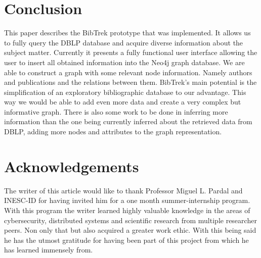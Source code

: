 \documentclass[twocolumn]{article}
\begin{document}
\section{Conclusion}
This paper describes the BibTrek prototype that was implemented. It allows us to fully query the DBLP database and acquire diverse information about the subject matter. Currently it presents a fully functional user interface allowing the user to insert all obtained information into the Neo4j graph database. We are able to construct a graph with some relevant node information. Namely authors and publications and the relations between them. BibTrek's main potential is the simplification of an exploratory bibliographic database to our advantage. This way we would be able to add even more data and create a very complex but informative graph. There is also some work to be done in inferring more information than the one being currently inferred about the retrieved data from DBLP, adding more nodes and attributes to the graph representation.

\section{Acknowledgements}
The writer of this article would like to thank Professor Miguel L. Pardal and INESC-ID for having invited him for a one month summer-internship program. With this program the writer learned highly valuable knowledge in the areas of cybersecurity, distributed systems and scientific research from multiple researcher peers. Non only that but also acquired a greater work ethic. With this being said he has the utmost gratitude for having been part of this project from which he has learned immensely from. 
\end{document}

